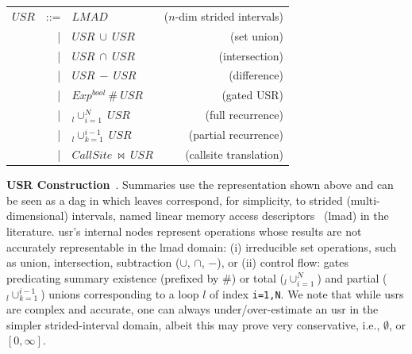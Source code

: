 \documentclass{sig-alternate}
\begin{document}

\vspace{1ex}
\hspace{-4ex}
\begin{tabular}{lclr}
$USR$ & ::= &  $LMAD$                 & ($n$-dim strided intervals)\\
      & {\tt~~}| & $USR \ \cup \ USR$ & (set union)\\
      & {\tt~~}| & $USR \ \cap \ USR$ & (intersection)\\
      & {\tt~~}| & $USR \ - \ USR$ & (difference)\\
      & {\tt~~}| & $Exp^{bool} \ \# \ USR$ & (gated USR)\\
      & {\tt~~}| & $_l\cup_{i=1}^{N} \ USR$ & (full recurrence)\\
      & {\tt~~}| & $_l\cup_{k=1}^{i-1} \ USR$ & (partial recurrence)\\
      & {\tt~~}| & $CallSite \ \bowtie \ USR$ & (callsite translation)
\end{tabular}%
\vspace{1ex}

{\bf USR Construction}~\cite{HybAn}.
%
Summaries use the representation shown above %
and can be seen as a {\sc dag} in which leaves correspond,
for simplicity, to strided (multi-dimensional) intervals, 
named linear memory access descriptors~\cite{LMAD} ({\sc lmad}) in the literature.
{\sc usr}'s internal nodes represent operations whose results are not
accurately representable in the {\sc lmad} domain: (i) irreducible set
operations, such as union, intersection, subtraction ($\cup$, $\cap$, $-$), 
or (ii) control flow: gates predicating
summary existence (prefixed by $\#$) or total ($_l\cup_{i=1}^N$) and partial 
($_l\cup_{k=1}^{i-1}$) unions corresponding to a loop $l$ of
index {\tt i=1,N}. 
%
We note that while {\sc usr}s are complex and accurate,
one can always under/over-estimate an {\sc usr} in the 
simpler strided-interval domain, albeit this may 
prove very conservative, i.e., $\emptyset$, or $[0,\infty]$. 
\end{document}
